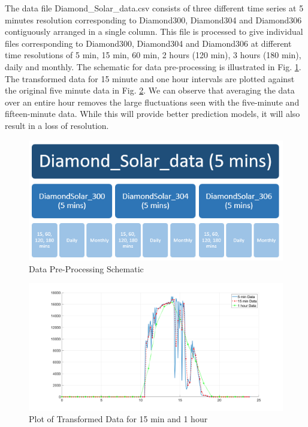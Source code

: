 \documentclass[journal]{IEEEtran}
\begin{document}
The data file Diamond\_Solar\_data.csv consists of three different time series at 5 minutes resolution corresponding to Diamond300, Diamond304 and Diamond306 contiguously arranged in a single column. This file is processed to give individual files corresponding to Diamond300, Diamond304 and Diamond306 at different time resolutions of 5 min, 15 min, 60 min, 2 hours (120 min), 3 hours (180 min), daily and monthly. The schematic for data pre-processing is illustrated in Fig. \ref{fig2}. The transformed data for 15 minute and one hour intervals are plotted against the original five minute data in Fig. \ref{fig3}. We can observe that averaging the data over an entire hour removes the large fluctuations seen with the five-minute and fifteen-minute data. While this will provide better prediction models, it will also result in a loss of resolution.

\begin{figure}[htpb]
\centering
\includegraphics[scale=0.65]{DataTransformationSchematic.png}
\caption{Data Pre-Processing Schematic}
\label{fig2} %
\end{figure}

\begin{figure}[htpb]
	\centering
	\includegraphics[scale=0.2]{TransformedDataPlot.png}
	\caption{Plot of Transformed Data for 15 min and 1 hour}
	\label{fig3} %
\end{figure}
\end{document}
